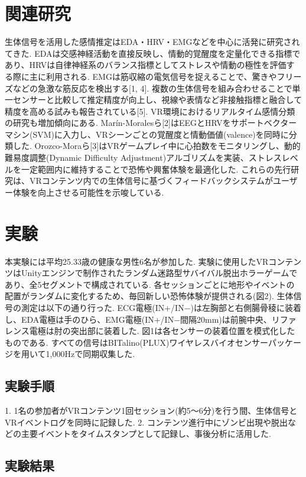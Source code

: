 \documentclass[a4paper]{jarticle}
\begin{document}
\section{関連研究}%

生体信号を活用した感情推定はEDA・HRV・EMGなどを中心に活発に研究されてきた. EDAは交感神経活動を直接反映し、情動的覚醒度を定量化できる指標であり、HRVは自律神経系のバランス指標としてストレスや情動の極性を評価する際に主に利用される. EMGは筋収縮の電気信号を捉えることで、驚きやフリーズなどの急激な筋反応を検出する[1, 4]. 複数の生体信号を組み合わせることで単一センサーと比較して推定精度が向上し、視線や表情など非接触指標と融合して精度を高める試みも報告されている[5]. VR環境におけるリアルタイム感情分類の研究も増加傾向にある. Marín-Moralesら[2]はEEGとHRVをサポートベクターマシン(SVM)に入力し、VRシーンごとの覚醒度と情動価値(valence)を同時に分類した. Orozco-Moraら[3]はVRゲームプレイ中に心拍数をモニタリングし、動的難易度調整(Dynamic Difficulty Adjustment)アルゴリズムを実装、ストレスレベルを一定範囲内に維持することで恐怖や興奮体験を最適化した. これらの先行研究は、VRコンテンツ内での生体信号に基づくフィードバックシステムがユーザー体験を向上させる可能性を示唆している.

\section{実験}%
本実験には平均25.33歳の健康な男性6名が参加した. 実験に使用したVRコンテンツはUnityエンジンで制作されたランダム迷路型サバイバル脱出ホラーゲームであり、全5セグメントで構成されている. 各セッションごとに地形やイベントの配置がランダムに変化するため、毎回新しい恐怖体験が提供される(図2). 生体信号の測定は以下の通り行った. ECG電極(IN+/IN−)は左胸部と右側腸骨稜に装着し、EDA電極は手のひら、EMG電極(IN+/IN−間隔20mm)は前腕中央、リファレンス電極は肘の突出部に装着した. 図1は各センサーの装着位置を模式化したものである. すべての信号はBITalino(PLUX)ワイヤレスバイオセンサーパッケージを用いて1,000Hzで同期収集した.

\subsection{実験手順}%
1. 1名の参加者がVRコンテンツ1回セッション(約5〜6分)を行う間、生体信号とVRイベントログを同時に記録した. 
2. コンテンツ進行中にゾンビ出現や脱出などの主要イベントをタイムスタンプとして記録し、事後分析に活用した.

\subsection{実験結果}%
\end{document}
